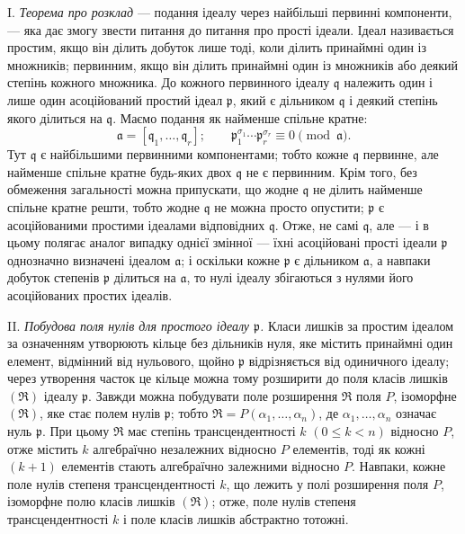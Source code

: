 \documentclass[11pt]{article}
\providecommand{\fraka}{\mathfrak a}
\providecommand{\frakp}{\mathfrak p}
\providecommand{\frakq}{\mathfrak q}
\providecommand{\frakR}{\mathfrak R}
\begin{document}
\noindent I. \emph{Теорема про розклад} --- подання ідеалу через найбільші первинні компоненти, --- яка дає змогу звести питання до питання про прості ідеали. Ідеал називається простим, якщо він ділить добуток лише тоді, коли ділить принаймні один із множників; первинним, якщо він ділить принаймні один із множників або деякий степінь кожного множника. До кожного первинного ідеалу $\frakq$ належить один і лише один асоційований простий ідеал $\frakp$, який є дільником $\frakq$ і деякий степінь якого ділиться на $\frakq$. Маємо подання як найменше спільне кратне:
\[
 \fraka=[\frakq_1,\ldots,\frakq_r];\qquad
 \frakp_1^{\sigma_1}\cdots \frakp_r^{\sigma_r}\equiv 0\pmod{\fraka}.
\]
Тут $\frakq$ є найбільшими первинними компонентами; тобто кожне $\frakq$ первинне, але найменше спільне кратне будь-яких двох $\frakq$ не є первинним. Крім того, без обмеження загальності можна припускати, що жодне $\frakq$ не ділить найменше спільне кратне решти, тобто жодне $\frakq$ не можна просто опустити; $\frakp$ є асоційованими простими ідеалами відповідних $\frakq$. Отже, не самі $\frakq$, але --- і в цьому полягає аналог випадку однієї змінної --- їхні асоційовані прості ідеали $\frakp$ однозначно визначені ідеалом $\fraka$; і оскільки кожне $\frakp$ є дільником $\fraka$, а навпаки добуток степенів $\frakp$ ділиться на $\fraka$, то нулі ідеалу збігаються з нулями його асоційованих простих ідеалів.

\noindent II. \emph{Побудова поля нулів для простого ідеалу $\frakp$.} Класи лишків за простим ідеалом за означенням утворюють кільце без дільників нуля, яке містить принаймні один елемент, відмінний від нульового, щойно $\frakp$ відрізняється від одиничного ідеалу; через утворення часток це кільце можна тому розширити до поля класів лишків $(\frakR)$ ідеалу $\frakp$. Завжди можна побудувати поле розширення $\frakR$ поля $P$, ізоморфне $(\frakR)$, яке стає полем нулів $\frakp$; тобто $\frakR=P(\alpha_1,\ldots,\alpha_n)$, де $\alpha_1,\ldots,\alpha_n$ означає нуль $\frakp$. При цьому $\frakR$ має степінь трансцендентності $k$ $(0\leq k<n)$ відносно $P$, отже містить $k$ алгебраїчно незалежних відносно $P$ елементів, тоді як кожні $(k+1)$ елементів стають алгебраїчно залежними відносно $P$. Навпаки, кожне поле нулів степеня трансцендентності $k$, що лежить у полі розширення поля $P$, ізоморфне полю класів лишків $(\frakR)$; отже, поле нулів степеня трансцендентності $k$ і поле класів лишків абстрактно тотожні.
\end{document}
